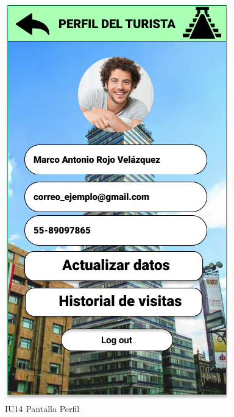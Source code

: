 \begin{figure}[h]
    \begin{minipage}{0.5\textwidth}
        \centering
        \includegraphics[width=.7\linewidth]{Pantallas Prototipo3/IU14 Pantalla de perfil.jpg}
        \caption{IU14 Pantalla Perfil}
    \end{minipage}%
\end{figure}


